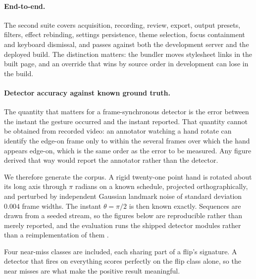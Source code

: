 \documentclass{article}
\theoremstyle{definition}
\begin{document}
\paragraph{End-to-end.}
The second suite covers acquisition, recording, review, export, output presets,
filters, effect rebinding, settings persistence, theme selection, focus
containment and keyboard dismissal, and passes against both the development
server and the deployed build. The distinction matters: the bundler moves
stylesheet links in the built page, and an override that wins by source order in
development can lose in the build.

\paragraph{Detector accuracy against known ground truth.}
The quantity that matters for a frame-synchronous detector is the error between
the instant the gesture occurred and the instant reported. That quantity cannot
be obtained from recorded video: an annotator watching a hand rotate can identify
the edge-on frame only to within the several frames over which the hand appears
edge-on, which is the same order as the error to be measured. Any figure derived
that way would report the annotator rather than the detector.

We therefore generate the corpus. A rigid twenty-one point hand is rotated about
its long axis through $\pi$ radians on a known schedule, projected
orthographically, and perturbed by independent Gaussian landmark noise of
standard deviation $0.004$ frame widths. The instant $\theta = \pi/2$ is then
known exactly. Sequences are drawn from a seeded stream, so the figures below
are reproducible rather than merely reported, and the evaluation runs the shipped
detector modules rather than a reimplementation of them
\citep{thakur2026gesturefx}.

Four near-miss classes are included, each sharing part of a flip's signature. A
detector that fires on everything scores perfectly on the flip class alone, so
the near misses are what make the positive result meaningful.
\end{document}
